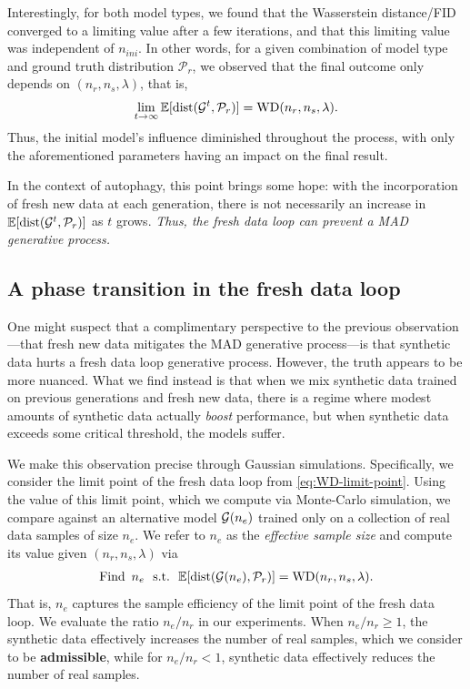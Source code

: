 \documentclass{article}
\def\bias{{\lambda}}
\def\colorFresh{colorC}
\def\fresh{\textcolor{\colorFresh}{fresh data loop}}
\begin{document}
Interestingly, for both model types, we found that the Wasserstein distance/FID converged to a limiting value after a few iterations, and that this limiting value was independent of $n_{ini}$.
In other words, for a given combination of model type and ground truth distribution $\mathcal{P}_r$, we observed that
the final outcome only depends on  $(n_r, n_s, \bias)$, that is,
\begin{align}
\lim_{t\rightarrow \infty} \mathbb{E}[\mathrm{dist}(\model^t, \mathcal{P}_r)] = \mathrm{WD}(n_r,n_s,\bias).
\label{eq:WD-limit-point}
\end{align}
Thus, the initial model's influence diminished throughout the process, with only the aforementioned parameters having an impact on the final result. 

In the context of autophagy, this point brings some hope: with the incorporation of fresh new data at each generation, there is not necessarily an increase in $\mathbb{E}[\mathrm{dist}(\mathcal{G}^t, \mathcal{P}_r)]$ as $t$ grows. \textit{Thus, the \fresh{} can prevent a MAD generative process.}



\subsection{A phase transition in the \fresh{}}

One might suspect that a complimentary perspective to the previous observation---that fresh new data mitigates the MAD generative process---is that synthetic data hurts a \fresh{} generative process. However, the truth appears to be more nuanced. What we find instead is that when we mix synthetic data trained on previous generations and fresh new data, there is a regime where modest amounts of synthetic data actually \emph{boost} performance, but when synthetic data exceeds some critical threshold, the models suffer. 

We make this observation precise through Gaussian simulations.
Specifically, we consider the limit point of the fresh data loop from \cref{eq:WD-limit-point}. Using the value of this limit point, which we compute via Monte-Carlo simulation, we compare against an alternative model $\mathcal{G}(n_e)$ trained only on a collection of real data samples of size $n_e$. We refer to $n_e$ as the \emph{effective sample size} and compute its value given $(n_r, n_s, \lambda)$ via
\begin{align}
    \mathrm{Find} \,\,\, n_e \,\,\,\, \mathrm{s.t.} \,\,\,\,\mathbb{E}[\mathrm{dist}(\model(n_e), \mathcal{P}_r)] = \mathrm{WD}(n_r,n_s,\bias).
\end{align}
That is, $n_e$ captures the sample efficiency of the limit point of the \fresh{}. We evaluate the ratio $n_e/n_r$ in our experiments. When $n_e / n_r \geq 1$, the synthetic data effectively increases the number of real samples, which we consider to be \textbf{admissible}, while for $n_e / n_r < 1$, synthetic data effectively reduces the number of real samples.
\end{document}
